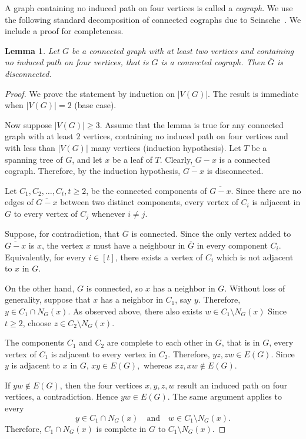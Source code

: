 \documentclass[11pt,a4paper]{article}
\newtheorem{lemma}[theorem]{Lemma}
\theoremstyle{definition}
\theoremstyle{remark}
\begin{document}
A graph containing no induced path on four vertices is called a
\emph{cograph}. We use the following standard decomposition of connected
cographs due to Seinsche~\cite{seinsche1974property}. We include a proof
for completeness.


\begin{lemma}
\label{lem:cograph-complement}
Let $G$ be a connected graph with at least two vertices and containing
no induced path on four vertices, that is $G$ is a connected cograph. Then $\overline{G}$ is disconnected.
\end{lemma}

\begin{proof}
We prove the statement by induction on $|V(G)|$. The result is immediate
when $|V(G)|=2$ (base case).

Now suppose $|V(G)|\geq 3$. Assume that the lemma is true for any connected graph with at least $2$ vertices, containing no induced path on four vertices and with less than $|V(G)|$ many vertices (induction hypothesis). Let $T$ be a spanning tree of $G$, and let
$x$ be a leaf of $T$. Clearly, $G-x$ is a connected cograph.
Therefore, by the induction hypothesis,
    $\overline{G-x}$ is disconnected.

Let $C_1,C_2,\ldots,C_t, t\geq 2$,
be the connected components of $\overline{G-x}$. Since there are no edges
of $\overline{G-x}$ between two distinct components, every vertex of
$C_i$ is adjacent in $G$ to every vertex of $C_j$ whenever $i\neq j$.

Suppose, for contradiction, that $\overline{G}$ is connected. Since the
only vertex added to $\overline{G-x}$ is $x$, the vertex $x$ must have a
neighbour in $\overline{G}$ in every component $C_i$. Equivalently, for
every $i\in[t]$, there exists a vertex of $C_i$ which is not adjacent to
$x$ in $G$.

On the other hand, $G$ is connected, so $x$ has a neighbor in $G$.
Without loss of generality, suppose that $x$ has a neighbor in $C_1$, say $y$. Therefore,
    $y\in C_1\cap N_G(x).$
As observed above, there also exists
    $w\in C_1\setminus N_G(x)$
Since $t\geq 2$, choose $z\in C_2\setminus N_G(x).$

The components $C_1$ and $C_2$ are complete to each other in $G$, that is in $G$, every vertex of $C_1$ is adjacent to every vertex in $C_2$.
Therefore, $yz,zw\in E(G).$
Since $y$ is adjacent to $x$ in $G$, $xy\in E(G),$ whereas $xz,xw\notin E(G).$

If $yw\notin E(G)$, then the four vertices $x,y,z,w$ result an induced path on four vertices, a contradiction. Hence
    $yw\in E(G).$ The same argument applies to every
$$
    y\in C_1\cap N_G(x)
    \quad\text{and}\quad
    w\in C_1\setminus N_G(x).
$$
Therefore, $C_1\cap N_G(x)$
is complete in $G$ to $C_1\setminus N_G(x)$.


\end{proof}
\end{document}
